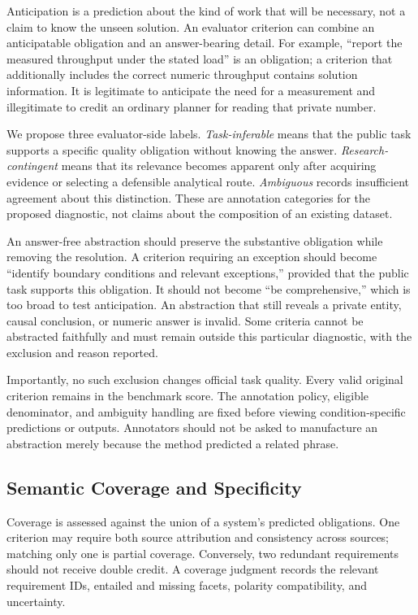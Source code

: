 Anticipation is a prediction about the kind of work that will be necessary, not a claim to know the unseen solution. An evaluator criterion can combine an anticipatable obligation and an answer-bearing detail. For example, ``report the measured throughput under the stated load'' is an obligation; a criterion that additionally includes the correct numeric throughput contains solution information. It is legitimate to anticipate the need for a measurement and illegitimate to credit an ordinary planner for reading that private number.

We propose three evaluator-side labels. \emph{Task-inferable} means that the public task supports a specific quality obligation without knowing the answer. \emph{Research-contingent} means that its relevance becomes apparent only after acquiring evidence or selecting a defensible analytical route. \emph{Ambiguous} records insufficient agreement about this distinction. These are annotation categories for the proposed diagnostic, not claims about the composition of an existing dataset.

An answer-free abstraction should preserve the substantive obligation while removing the resolution. A criterion requiring an exception should become ``identify boundary conditions and relevant exceptions,'' provided that the public task supports this obligation. It should not become ``be comprehensive,'' which is too broad to test anticipation. An abstraction that still reveals a private entity, causal conclusion, or numeric answer is invalid. Some criteria cannot be abstracted faithfully and must remain outside this particular diagnostic, with the exclusion and reason reported.

Importantly, no such exclusion changes official task quality. Every valid original criterion remains in the benchmark score. The annotation policy, eligible denominator, and ambiguity handling are fixed before viewing condition-specific predictions or outputs. Annotators should not be asked to manufacture an abstraction merely because the method predicted a related phrase.

\subsection{Semantic Coverage and Specificity}

Coverage is assessed against the union of a system's predicted obligations. One criterion may require both source attribution and consistency across sources; matching only one is partial coverage. Conversely, two redundant requirements should not receive double credit. A coverage judgment records the relevant requirement IDs, entailed and missing facets, polarity compatibility, and uncertainty.

